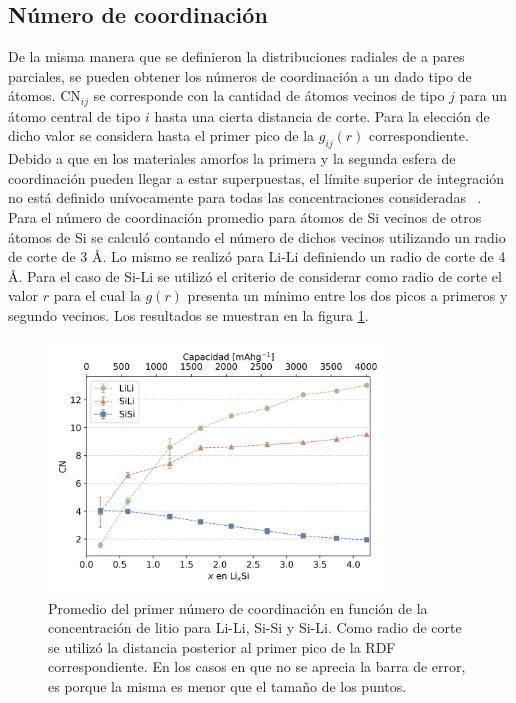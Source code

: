 \subsection{Número de coordinación}

De la misma manera que se definieron la distribuciones radiales de a pares parciales,
se pueden obtener los números de coordinación a un dado tipo de átomos. CN$_{ij}$
se corresponde con la cantidad de átomos vecinos de tipo $j$ para un átomo central
de tipo $i$ hasta una cierta distancia de corte. Para la elección de dicho valor 
se considera hasta el primer pico de la $g_{ij}(r)$ correspondiente. Debido a que 
en los materiales amorfos la primera y la segunda esfera de coordinación pueden 
llegar a estar superpuestas, el límite superior de integración no está definido 
unívocamente para todas las concentraciones consideradas ~\cite{lamparter1995}.
Para el número de coordinación promedio para átomos de Si vecinos de otros átomos 
de Si se calculó contando el número de dichos vecinos utilizando un radio de 
corte de 3 \AA. Lo mismo se realizó para Li-Li definiendo un radio de corte de 
4 \AA. Para el caso de Si-Li se utilizó el criterio de considerar como radio de 
corte el valor $r$ para el cual la $g(r)$ presenta un mínimo entre los dos picos
a primeros y segundo vecinos. Los resultados se muestran en la figura 
\ref{fig:cn1}.
\begin{figure}[th]
    \centering
    \includegraphics[width=0.8\textwidth]{caracterizacion/resultados/cn/cn.png}
    \caption{Promedio del primer número de coordinación en función de la 
    concentración de litio para Li-Li, Si-Si y Si-Li. Como radio de corte se 
    utilizó la distancia posterior al primer pico de la RDF correspondiente. En 
    los casos en que no se aprecia la barra de error, es porque la misma es menor 
    que el tamaño de los puntos.}
    \label{fig:cn1}
\end{figure}

